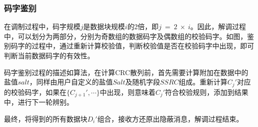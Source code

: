 \subsubsection{码字鉴别}
\label{chap:zigzag:model:demodulation:identification}

在调制过程中，码字规模$j$是数据块规模$i$的2倍，即$j\ =\ 2\ \times\ i$。因此，解调过程中，可以划分为两部分，分别为奇数组的数据码字及偶数组的校验码字。如图，鉴别码字的过程中，通过重新计算校验值，判断校验值是否在校验码字中出现，即可判断当前数据码字的有效性。

码字鉴别过程的描述如算法，在计算CRC散列前，首先需要计算附加在数据中的盐值$salt$，同样由用户自定义的盐值$Salt$及随机字段$SSRC$组成。重新计算$C_{j}'$对应的校验码字，如果在$\{C_{j+1}',\cdots\}$中出现，则意味着$C_{j}'$符合校验规则，添加到结果中，进行下一轮辨别。

最终，将得到的所有数据块$D_{i}'$组合，接收方还原出隐蔽消息，解调过程结束。